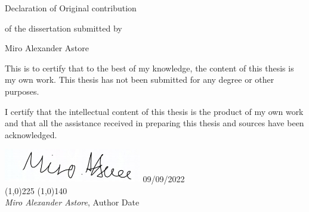 \newpage
\begin{center}
Declaration of Original contribution

\vspace{0.5in}

of the dissertation submitted by

\vspace{0.25in}

Miro Alexander Astore

\end{center}

\vspace{0.5in}

\noindent This is to certify that to the best of my knowledge, the content of this 
thesis is my own work. This thesis has not been submitted for any degree or other 
purposes.

\noindent I certify that the intellectual content of this thesis is the product of 
my own work and that all the assistance received in preparing this thesis and sources 
have been acknowledged.

\vspace{1in}


\includegraphics[width=6cm]{figures/miro_signature.png} \hspace{3.0cm} 09/09/2022\\
\noindent \line(1,0){225} \hspace{1.0cm} \line(1,0){140} \\
 {\em Miro Alexander Astore}, Author \hspace{3.65cm} Date
